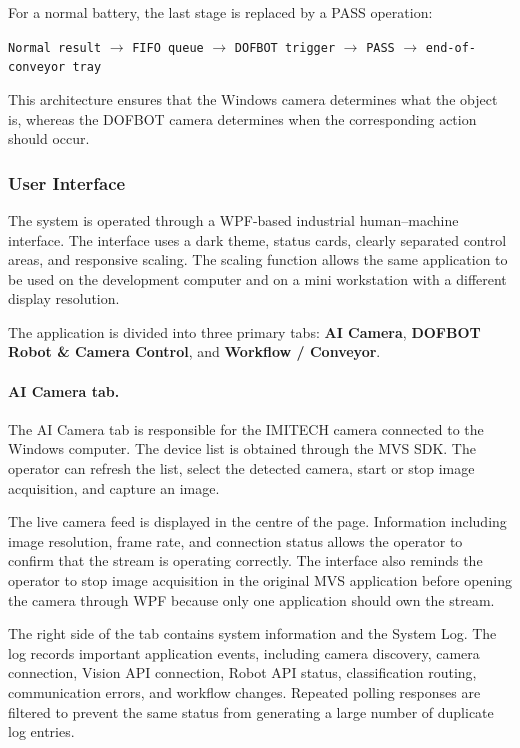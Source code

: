 For a normal battery, the last stage is replaced by a PASS operation:

\begin{center}
\texttt{Normal result} $\rightarrow$ \texttt{FIFO queue} $\rightarrow$ \texttt{DOFBOT trigger} $\rightarrow$ \texttt{PASS} $\rightarrow$ \texttt{end-of-conveyor tray}
\end{center}

This architecture ensures that the Windows camera determines what the object is, whereas the DOFBOT camera determines when the corresponding action should occur.


\subsubsection{User Interface}
\label{sec:user-interface}

The system is operated through a WPF-based industrial human--machine interface. The interface uses a dark theme, status cards, clearly separated control areas, and responsive scaling. The scaling function allows the same application to be used on the development computer and on a mini workstation with a different display resolution.

The application is divided into three primary tabs: \textbf{AI Camera}, \textbf{DOFBOT Robot \& Camera Control}, and \textbf{Workflow / Conveyor}.

\paragraph{AI Camera tab.}
The AI Camera tab is responsible for the IMITECH camera connected to the Windows computer. The device list is obtained through the MVS SDK. The operator can refresh the list, select the detected camera, start or stop image acquisition, and capture an image.

The live camera feed is displayed in the centre of the page. Information including image resolution, frame rate, and connection status allows the operator to confirm that the stream is operating correctly. The interface also reminds the operator to stop image acquisition in the original MVS application before opening the camera through WPF because only one application should own the stream.

The right side of the tab contains system information and the System Log. The log records important application events, including camera discovery, camera connection, Vision API connection, Robot API status, classification routing, communication errors, and workflow changes. Repeated polling responses are filtered to prevent the same status from generating a large number of duplicate log entries.

